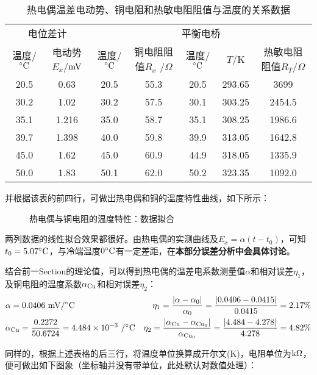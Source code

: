 \documentclass[11pt]{article}
\begin{document}
\begin{table}[H]
    \centering
    \caption{热电偶温差电动势、铜电阻和热敏电阻阻值与温度的关系数据}
    \begin{tabular}{cccc|ccc}
        \toprule
        \multicolumn{2}{c}{电位差计}&\multicolumn{5}{c}{平衡电桥}\\
        \cmidrule(lr){1-2}\cmidrule(lr){3-7}
        温度/$^\circ \rm C$ & 电动势$E_x$/$\rm mV$ & 温度/$^\circ \rm C$ & 铜电阻阻值$R_x$ /$\Omega$ & 温度/$^\circ \rm C$ & $T$/K & 热敏电阻阻值$R_T$/$\Omega$ \\ 
        \midrule
        20.5 & 0.63 & 20.5 & 55.3 & 20.5 & 293.65 & 3699 \\ 
        30.2 & 1.02 & 30.2 & 57.5 & 30.1 & 303.25 & 2454.5 \\ 
        35.1 & 1.216 & 35.0 & 58.7 & 35.1 & 308.25 & 1986.6 \\ 
        39.7 & 1.398 & 40.0 & 59.8 & 39.9 & 313.05 & 1642.8 \\ 
        45.0 & 1.62 & 45.0 & 60.9 & 44.9 & 318.05 & 1335.9 \\ 
        50.0 & 1.83 & 50.1 & 62.0 & 50.2 & 323.35 & 1092.0 \\ 
        \bottomrule
    \end{tabular}
\end{table}
并根据该表的前四行，可做出热电偶和铜的温度特性曲线，如下所示：
\begin{figure}[H] 
    \centering
    \caption{热电偶与铜电阻的温度特性：数据拟合}
\end{figure}
两列数据的线性拟合效果都很好。由热电偶的实测曲线及$E_x=\alpha(t-t_0)$，可知$t_0=5.07^\circ\rm C$，与冷端温度$0^\circ \rm C$有一定差距，在\textbf{本部分误差分析中会具体讨论}。

结合前一Section的理论值，可以得到热电偶的温差电系数测量值$\alpha$和相对误差$\eta_1$，
及铜电阻的温度系数$\alpha_{\rm Cu}$和相对误差$\eta_2$：
\begin{align*}
    &\alpha=0.0406\,\,{\rm mV/^\circ C} &\eta_1=\frac{|\alpha-\alpha_0|}{\alpha_0}=\frac{|0.0406-0.0415|}{0.0415}=2.17\%\\
    &\alpha_{\rm Cu}=\frac{0.2272}{50.6724}=4.484\times 10^{-3}\,\,{/^\circ \rm C} &\eta_2=\frac{|\alpha_{\rm Cu}-\alpha_{\rm Cu_0}|}{\alpha_{\rm Cu_0}}=\frac{|4.484-4.278|}{4.278}=4.82\%
\end{align*}

同样的，根据上述表格的后三行，将温度单位换算成开尔文(K)，电阻单位为$\rm k\Omega$，
便可做出如下图象（坐标轴并没有带单位，此处默认对数值处理）：
\end{document}
